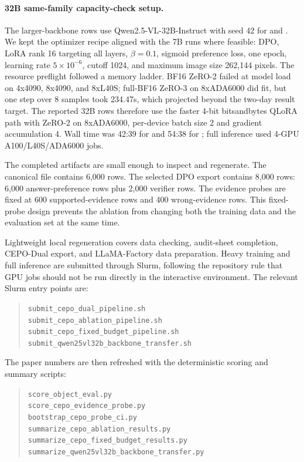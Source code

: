 \paragraph{32B same-family capacity-check setup.}
The larger-backbone rows use Qwen2.5-VL-32B-Instruct with seed 42 for
\answerdpo{} and \dualtwok{}. We kept the optimizer recipe aligned with the 7B
runs where feasible: DPO, LoRA rank 16 targeting all layers, $\beta=0.1$,
sigmoid preference loss, one epoch, learning rate $5\times10^{-6}$, cutoff
1024, and maximum image size 262{,}144 pixels. The resource preflight followed
a memory ladder. BF16 ZeRO-2 failed at model load on 4x4090, 8x4090, and
8xL40S; full-BF16 ZeRO-3 on 8xADA6000 did fit, but one step over 8 samples
took 234.47s, which projected beyond the two-day result target. The reported
32B rows therefore use the faster 4-bit bitsandbytes QLoRA path with ZeRO-2 on
8xADA6000, per-device batch size 2 and gradient accumulation 4. Wall time was
42:39 for \answerdpo{} and 54:38 for \dualtwok{}; full inference used 4-GPU
A100/L40S/ADA6000 jobs.

The completed artifacts are small enough to inspect and regenerate. The
canonical \dataset{} file contains 6{,}000 rows. The selected \dualtwok{} DPO
export contains 8{,}000 rows: 6{,}000 answer-preference rows plus 2{,}000
verifier rows. The evidence probes are fixed at 600 supported-evidence rows
and 400 wrong-evidence rows. This fixed-probe design prevents the ablation from
changing both the training data and the evaluation set at the same time.

Lightweight local regeneration covers data checking, audit-sheet completion,
CEPO-Dual export, and LLaMA-Factory data preparation. Heavy training and full
inference are submitted through Slurm, following the repository rule that GPU
jobs should not be run directly in the interactive environment. The relevant
Slurm entry points are:
\begin{quote}
\footnotesize
\texttt{submit\_cepo\_dual\_pipeline.sh}\\
\texttt{submit\_cepo\_ablation\_pipeline.sh}\\
\texttt{submit\_cepo\_fixed\_budget\_pipeline.sh}\\
\texttt{submit\_qwen25vl32b\_backbone\_transfer.sh}
\end{quote}
The paper numbers are then refreshed with the deterministic scoring and
summary scripts:
\begin{quote}
\footnotesize
\texttt{score\_object\_eval.py}\\
\texttt{score\_cepo\_evidence\_probe.py}\\
\texttt{bootstrap\_cepo\_probe\_ci.py}\\
\texttt{summarize\_cepo\_ablation\_results.py}\\
\texttt{summarize\_cepo\_fixed\_budget\_results.py}\\
\texttt{summarize\_qwen25vl32b\_backbone\_transfer.py}
\end{quote}

